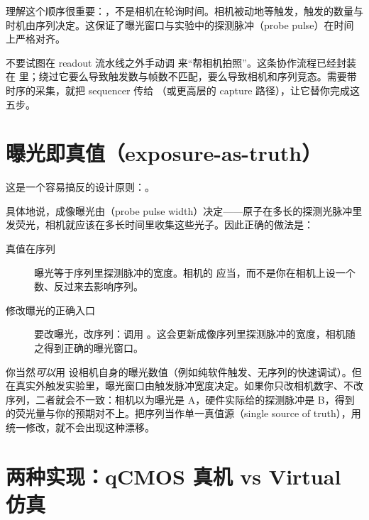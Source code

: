 \documentclass[11pt,oneside,openany]{book}
\begin{document}
理解这个顺序很重要：，不是相机在轮询时间。相机被动地等触发，触发的数量与时机由序列决定。这保证了曝光窗口与实验中的探测脉冲（probe pulse）在时间上严格对齐。

\begin{notebox}[常见错误]
不要试图在 readout 流水线之外手动调  来“帮相机拍照”。这条协作流程已经封装在  里；绕过它要么导致触发数与帧数不匹配，要么导致相机和序列竞态。需要带时序的采集，就把 sequencer 传给 （或更高层的 capture 路径），让它替你完成这五步。
\end{notebox}

\section{曝光即真值（exposure-as-truth）}

这是一个容易搞反的设计原则：。

具体地说，成像曝光由（probe pulse width）决定——原子在多长的探测光脉冲里发荧光，相机就应该在多长时间里收集这些光子。因此正确的做法是：

\begin{description}
\item[真值在序列] 曝光等于序列里探测脉冲的宽度。相机的  应当，而不是你在相机上设一个数、反过来去影响序列。
\item[修改曝光的正确入口] 要改曝光，改序列：调用 。这会更新成像序列里探测脉冲的宽度，相机随之得到正确的曝光窗口。
\end{description}

\begin{notebox}[为什么不直接 camera.configure(exposure=...)？]
你当然\emph{可以}用  设相机自身的曝光数值（例如纯软件触发、无序列的快速调试）。但在真实外触发实验里，曝光窗口由触发脉冲宽度决定。如果你只改相机数字、不改序列，二者就会不一致：相机以为曝光是 A，硬件实际给的探测脉冲是 B，得到的荧光量与你的预期对不上。把序列当作单一真值源（single source of truth），用  统一修改，就不会出现这种漂移。
\end{notebox}

\section{两种实现：qCMOS 真机 vs Virtual 仿真}
\end{document}
